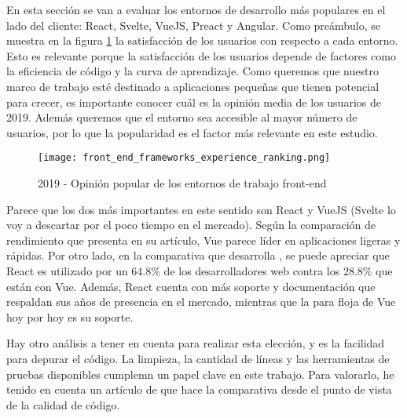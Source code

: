 En esta sección se van a evaluar los entornos de desarrollo más populares en el lado del cliente: React, Svelte, VueJS, Preact y Angular. Como preámbulo, se muestra en la figura \cref{fig:stjs2019:frontend} la satisfacción de los usuarios con respecto a cada entorno. Esto es relevante porque la satisfacción de los usuarios depende de factores como la eficiencia de código y la curva de aprendizaje. Como queremos que nuestro marco de trabajo esté destinado a aplicaciones pequeñas que tienen potencial para crecer, es importante conocer cuál es la opinión media de los usuarios de 2019. Además queremos que el entorno sea accesible al mayor número de usuarios, por lo que la popularidad es el factor más relevante en este estudio. 

\begin{figure}
	\centering
	\texttt{[image: front\_end\_frameworks\_experience\_ranking.png]}
	\caption{2019 - Opinión popular de los entornos de trabajo front-end}
	\label{fig:stjs2019:frontend}
\end{figure}

Parece que los dos más importantes en este sentido son React y VueJS (Svelte lo voy a descartar por el poco tiempo en el mercado). Según la comparación de rendimiento que presenta \citet{RWC2019} en su artículo, Vue parece líder en aplicaciones ligeras y rápidas. Por otro lado, en la comparativa que desarrolla \citet{TJSF2019}, se puede apreciar que React es utilizado por un 64.8\% de los desarrolladores web contra los 28.8\% que están con Vue. Además, React cuenta con más soporte y documentación que respaldan sus años de presencia en el mercado, mientras que la para floja de Vue hoy por hoy es su soporte.

Hay otro análisis a tener en cuenta para realizar esta elección, y es la facilidad para depurar el código. La limpieza, la cantidad de líneas y las herramientas de pruebas disponibles cumplemn un papel clave en este trabajo. Para valorarlo, he tenido en cuenta un artículo de \citet{RVVCTOG} que hace la comparativa desde el punto de vista de la calidad de código.

